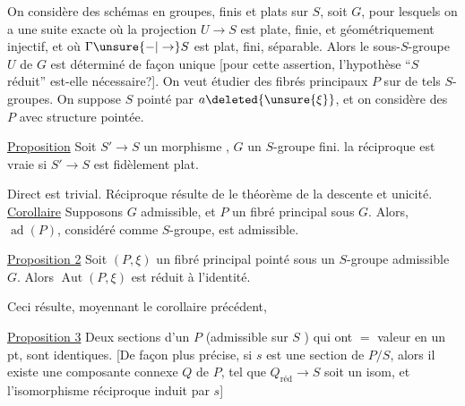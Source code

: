 On considère des schémas en groupes, finis et plats sur $S$, soit $G$, pour lesquels on a une suite exacte
où la projection $U\to S$ est plate, finie,  et géométriquement  injectif, et où $\Gamma\unsure{-|\to}S$ est plat, fini, séparable. Alors le sous-$S$-groupe $U$ de $G$ est déterminé de façon unique [pour cette assertion, l'hypothèse ``$S$ réduit'' est-elle nécessaire?].
On veut étudier des fibrés principaux  $P$ sur de tels $S$-groupes. On suppose $S$ pointé par $a\deleted{\unsure{\xi}}$, et on considère des $P$ avec structure pointée.

\uline{Proposition}  Soit $S'\to S$ un morphisme , $G$ un $S$-groupe fini.    la réciproque est vraie si $S'\to S$ est fidèlement plat.

Direct est trivial. Réciproque résulte de le théorème de la descente et unicité.
\uline{Corollaire} Supposons $G$ admissible, et $P$ un fibré principal sous $G$. Alors, $\operatorname{ad}(P)$, considéré comme $S$-groupe, est admissible.

\uline{Proposition 2} Soit $(P,\xi)$ un fibré principal pointé sous un $S$-groupe admissible $G$. Alors $\operatorname{Aut}(P,\xi)$ est réduit à l'identité.

Ceci résulte, moyennant le corollaire précédent, 

 \uline{Proposition 3} Deux sections d'un $P$  (admissible sur $S$ ) qui ont $=$ valeur en un pt, sont identiques. [De façon plus précise, si $s$ est une section de $P/S$, alors il existe une composante connexe  $Q$ de $P$, tel que $Q_{\text{réd}}\to S$ soit un isom, et l'isomorphisme réciproque induit par $s$]

